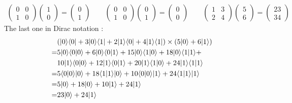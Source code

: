 \documentclass[12pt]{article}
\theoremstyle{exostyle}
\begin{document}
\begin{align*}
\left(\begin{array}{cccc}
 0 &0 \\
 1 &0
\end{array}\right)
\left(\begin{array}{c}
 1\\
 0
\end{array}\right)
=
\left(\begin{array}{c}
 0\\
 1
\end{array}\right)
\qquad
\left(\begin{array}{cccc}
 0 &0\\
 1 &0
\end{array}\right)
\left(\begin{array}{c}
 0\\
 1
\end{array}\right)
=
\left(\begin{array}{c}
 0\\
 0
\end{array}\right)
\qquad
\left(\begin{array}{cccc}
 1 &3 \\
 2 &4
\end{array}\right)
\left(\begin{array}{c}
 5\\
 6
\end{array}\right)
=
\left(\begin{array}{c}
 23\\
 34
\end{array}\right)
\end{align*}
The last one in Dirac notation :
\begin{align*}
  &(| 0 \rangle \langle 0 | + 3| 0 \rangle \langle 1 | + 2 | 1 \rangle \langle 0 | + 4 | 1 \rangle \langle 1 |)\times
  (5| 0 \rangle + 6 | 1 \rangle) \\
  =&5| 0 \rangle \langle 0 | 0 \rangle + 6 | 0 \rangle \langle 0 | 1 \rangle + 15 | 0 \rangle \langle 1 | 0 \rangle + 18
    | 0 \rangle \langle 1 | 1 \rangle + \\
  & 10 | 1 \rangle \langle 0 | 0 \rangle + 12 | 1 \rangle \langle 0 | 1 \rangle + 20 | 1 \rangle \langle 1 | 0 \rangle +
    24 | 1 \rangle \langle 1 | 1 \rangle\\
  =&5 \langle 0 | 0 \rangle | 0 \rangle + 18 \langle 1 | 1 \rangle | 0 \rangle + 10 \langle 0 | 0 \rangle | 1 \rangle +
  24 \langle 1 | 1 \rangle | 1 \rangle \\
  =&5 | 0 \rangle + 18 | 0 \rangle + 10 | 1 \rangle + 24 | 1 \rangle \\
  =&23  | 0 \rangle + 24 | 1 \rangle
\end{align*}
\end{document}
